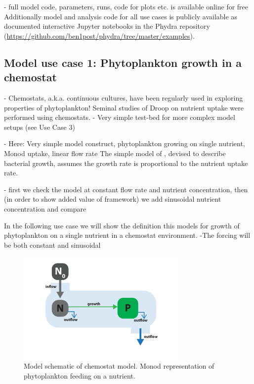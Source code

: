 \documentclass[journal abbreviation, manuscript]{copernicus}
\begin{document}
- full model code, parameters, runs, code for plots etc. is available online for free
Additionally model and analysis code for all use cases is publicly available as documented interactive Jupyter notebooks in the Phydra repository (\url{https://github.com/ben1post/phydra/tree/master/examples}). 



\subsection{Model use case 1: Phytoplankton growth in a chemostat}

- Chemostats, a.k.a. continuous cultures, have been regularly used in exploring properties of phytoplankton! Seminal studies of Droop on nutrient uptake were performed using chemostats. \citep{Droop1968VitaminLutheri} 
- Very simple test-bed for more complex model setups (see Use Case 3)

- Here: Very simple model construct, phytoplankton growing on single nutrient, Monod uptake, linear flow rate
The simple model of \citet{Monod1942RecherchesBacteriennes}, devised to describe bacterial growth, assumes the growth rate is proportional to the nutrient uptake rate.

- first we check the model at constant flow rate and nutrient concentration, then (in order to show added value of framework) we add sinusoidal nutrient concentration and compare


In the following use case we will show the definition this models for growth of phytoplankton on a single nutrient in a chemostat environment. 
-The forcing will be both constant and sinusoidal


\begin{figure}[t]
\includegraphics[width=8.3cm]{Figures/firstdraft_schematics/01_schematics_Chemostat.pdf}
\caption{Model schematic of chemostat model. Monod representation of phytoplankton feeding on a nutrient.}
\label{Figure:ModelSchematics_1}
\end{figure}
\end{document}
